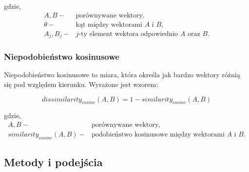             gdzie,
            \begin{align*}
                A, B -& \text{porównywane wektory,} \\
                \theta -& \text{kąt między wektorami $A$ i $B$,} \\
                A_j, B_j -& \text{$j$-ty element wektora odpowiednio $A$ oraz $B$.}
            \end{align*}

        \subsubsection{Niepodobieństwo kosinusowe}

            Niepodobieństwo kosinusowe to miara, która określa jak bardzo wektory różnią się pod względem kierunku. Wyrażone jest wzorem:

            \begin{equation}
                dissimilarity_{cosine}(A, B) = 1 - similarity_{cosine}(A, B)
            \end{equation}

            gdzie,
            \begin{align*}
                A, B -& \text{porównywane wektory,} \\
                similarity_{cosine}(A, B) -& \text{podobieństwo kosinusowe między wektorami $A$ i $B$.}
            \end{align*}

    \subsection{Metody i podejścia}


